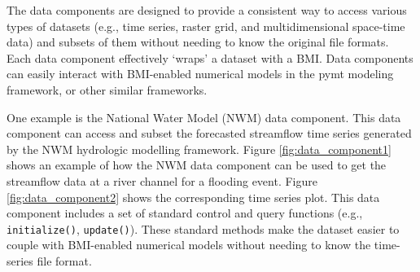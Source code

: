 \documentclass[12pt]{amsart}
\begin{document}
The data components are designed to provide a consistent way to access various types of datasets (e.g., time series, raster grid, and multidimensional space-time data) and subsets of them without needing to know the original file formats. Each data component effectively `wraps' a dataset with a BMI. Data components can easily interact with BMI-enabled numerical models in the pymt modeling framework, or other similar frameworks.

One example is the National Water Model (NWM) data component. This data component can access and subset the forecasted streamflow time series generated by the NWM hydrologic modelling framework. Figure \ref{fig:data_component1} shows an example of how the NWM data component can be used to get the streamflow data at a river channel for a flooding event. Figure \ref{fig:data_component2} shows the corresponding time series plot. This data component includes a set of standard control and query functions (e.g.,  \texttt{initialize()}, \texttt{update()}). These standard methods make the dataset easier to couple with BMI-enabled numerical models  without needing to know the time-series file format.
\end{document}
